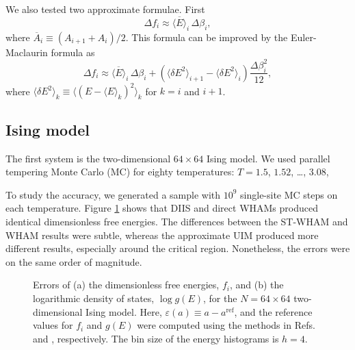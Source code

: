 \documentclass[reprint,aip,jcp,superscriptaddress]{revtex4-1}
\begin{document}
We also tested two approximate formulae.
%
First\cite{park2007}
%
\begin{equation}
\Delta f_i
\approx
\overline{ \langle E \rangle }_i \, \Delta \beta_i,
\label{eq:df_eav}
\end{equation}
where
$\overline{ A }_i \equiv (A_{i+1} + A_i)/2$.
%
This formula can be improved
by the Euler-Maclaurin formula\cite{
arfken, *whittaker, *wang_specfunc}
as
%
\begin{equation}
\Delta f_i
\approx
\overline{ \langle E \rangle }_i \, \Delta \beta_i
+
\left(
  \langle \delta E^2 \rangle_{i+1}
-
  \langle \delta E^2 \rangle_i
\right)
\frac{ \Delta \beta_i^2 }{ 12 },
\label{eq:df_eavb}
\end{equation}
%
where
$\langle \delta E^2 \rangle_k
\equiv \langle (E - \langle E \rangle_k)^2 \rangle_k$
for $k = i$ and $i + 1$.



\subsection{\label{sec:results_Ising}
Ising model}





The first system is
the two-dimensional $64\times64$ Ising model.
%
We used parallel tempering\cite{
swendsen1986, *geyer1991, *hukushima1996, *hansmann1997, *earl2005}
Monte Carlo (MC)
for
eighty temperatures: $T = 1.5$, $1.52$, \dots, $3.08$,



To study the accuracy,
we generated a sample with
$10^9$ single-site MC steps on each temperature.
%
Figure \ref{fig:is2ref} shows that
DIIS and direct WHAMs produced identical
dimensionless free energies.
%
The differences between the ST-WHAM and WHAM results
were subtle,
whereas the approximate UIM
produced more different results,
especially around the critical region.
%
Nonetheless,
the errors were on the same order of magnitude.



\begin{figure}[h]
  \caption{
    \label{fig:is2ref}
    Errors of
    (a) the dimensionless free energies, $f_i$, and
    (b) the logarithmic density of states, $\log g(E)$,
    for the $N = 64\times64$ two-dimensional Ising model.
    Here,
    $\varepsilon(a) \equiv a - a^\mathrm{ref}$,
    and the reference values for $f_i$ and $g(E)$
    were computed using the methods in
    Refs.  and ,
    respectively.
    The bin size of the energy histograms is $h = 4$.
  }
\end{figure}
\end{document}
